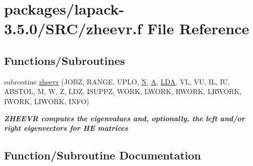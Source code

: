 \hypertarget{zheevr_8f}{}\section{packages/lapack-\/3.5.0/\+S\+R\+C/zheevr.f File Reference}
\label{zheevr_8f}
\subsection*{Functions/\+Subroutines}
\begin{DoxyCompactItemize}
\item 
subroutine \hyperlink{zheevr_8f_a60dd605c63d7183a4c289a4ab3df6df6}{zheevr} (J\+O\+B\+Z, R\+A\+N\+G\+E, U\+P\+L\+O, \hyperlink{polmisc_8c_a0240ac851181b84ac374872dc5434ee4}{N}, \hyperlink{classA}{A}, \hyperlink{example__user_8c_ae946da542ce0db94dced19b2ecefd1aa}{L\+D\+A}, V\+L, V\+U, I\+L, I\+U, A\+B\+S\+T\+O\+L, M, W, Z, L\+D\+Z, I\+S\+U\+P\+P\+Z, W\+O\+R\+K, L\+W\+O\+R\+K, R\+W\+O\+R\+K, L\+R\+W\+O\+R\+K, I\+W\+O\+R\+K, L\+I\+W\+O\+R\+K, I\+N\+F\+O)
\begin{DoxyCompactList}\small\item\em {\bfseries  Z\+H\+E\+E\+V\+R computes the eigenvalues and, optionally, the left and/or right eigenvectors for H\+E matrices} \end{DoxyCompactList}\end{DoxyCompactItemize}


\subsection{Function/\+Subroutine Documentation}
\hypertarget{zheevr_8f_a60dd605c63d7183a4c289a4ab3df6df6}{}
